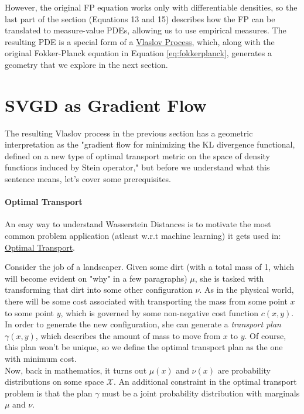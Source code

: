 \documentclass[12pt]{article}
\begin{document}
\noindent However, the original FP equation works only with differentiable densities, so the last part of the section (Equations 13 and 15) describes how the FP can be translated to measure-value PDEs, allowing us to use empirical measures. The resulting PDE is a special form of a \href{https://en.wikipedia.org/wiki/McKean\%E2\%80\%93Vlasov_process}{Vlaslov Process}, which, along with the original Fokker-Planck equation in Equation \ref{eq:fokkerplanck}, generates a geometry that we explore in the next section. 

\section{SVGD as Gradient Flow}

The resulting Vlaslov process in the previous section has a geometric interpretation as the "gradient flow for minimizing the KL divergence functional, defined on a new type of optimal transport metric on the space of density functions induced by Stein operator," but before we understand what this sentence means, let's cover some prerequisites.

\paragraph{Optimal Transport} An easy way to understand Wasserstein Distances is to motivate the most common problem application (atleast w.r.t machine learning) it gets used in: \href{https://en.wikipedia.org/wiki/Wasserstein_metric#Intuition_and_connection_to_optimal_transport}{Optimal Transport}. 

\noindent Consider the job of a landscaper. Given some dirt (with a total mass of 1, which will become evident on "why" in a few paragraphs) $\mu$, she is tasked with transforming that dirt into some other configuration $\nu$. As in the physical world, there will be some cost associated with transporting the mass from some point $x$ to some point $y$, which is governed by some non-negative cost function $c(x, y)$. In order to generate the new configuration, she can generate a \textit{transport plan} $\gamma(x, y)$, which describes the amount of mass to move from $x$ to $y$. Of course, this plan won't be unique, so we define the optimal transport plan as the one with minimum cost.
\\

\noindent Now, back in mathematics, it turns out $\mu(x)$ and $\nu(x)$ are probability distributions on some space $\mathcal{X}$. An additional constraint in the optimal transport problem is that the plan $\gamma$ must be a joint probability distribution with marginals $\mu$ and $\nu$. 
\end{document}
